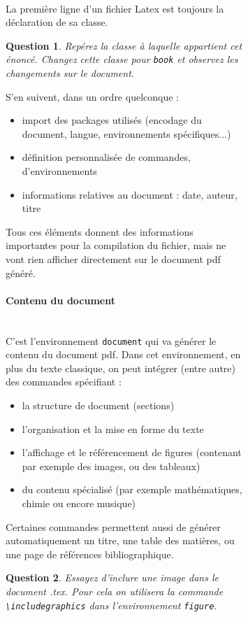 \documentclass[a4paper,11pt]{article}
\newtheorem{question}{Question}
\begin{document}
\begin{figure}
\begin{figure}
\ \\La première ligne d'un fichier Latex est toujours la déclaration de sa classe.

\begin{question} Repérez la classe à laquelle appartient cet énoncé. Changez cette classe pour {\tt book} et observez les changements sur le document.
\end{question}
S'en suivent, dans un ordre quelconque :
\begin{itemize}
  \item import des packages utilisés (encodage du document, langue, environnements spécifiques...)
  \item définition personnalisée de commandes, d'environnements
  \item informations relatives au document : date, auteur, titre
\end{itemize}
Tous ces éléments donnent des informations importantes pour la compilation du fichier, mais ne vont rien afficher directement sur le document pdf généré.

\paragraph{Contenu du document} \ \\
C'est l'environnement {\tt document} qui va générer le contenu du document pdf. Dans cet environnement, en plus du texte classique, on peut intégrer (entre autre) des commandes spécifiant :

\begin{itemize}
  \item la structure de document (sections)
  \item l'organisation et la mise en forme du texte
  \item l'affichage et le référencement de figures (contenant par exemple des images, ou des tableaux)
  \item du contenu spécialisé (par exemple mathématiques, chimie ou encore musique)
\end{itemize}

Certaines commandes permettent aussi de générer automatiquement un titre, une table des matières, ou une page de références bibliographique.

\begin{question} Essayez d'inclure une image dans le document .tex. Pour cela on utilisera la commande {\tt \textbackslash includegraphics} dans l'environnement {\tt figure}.
\end{question}


\end{figure}
\end{figure}
\end{document}
